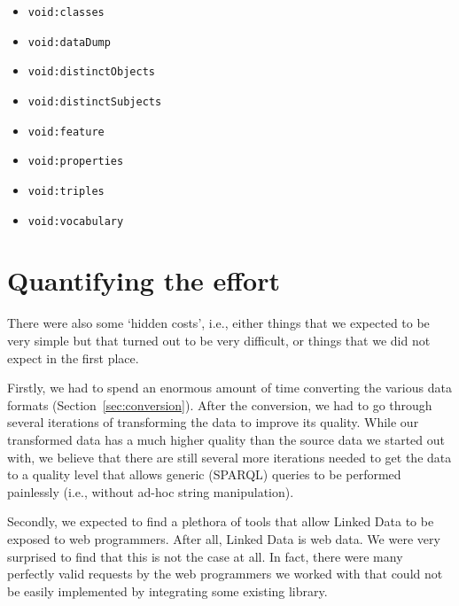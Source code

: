 \documentclass[a4paper]{scrartcl}
\newcommand{\textt}[1]{{\small \texttt{#1}}}
\begin{document}
\begin{itemize}
\item \textt{void:classes}
\item \textt{void:dataDump}
\item \textt{void:distinctObjects}
\item \textt{void:distinctSubjects}
\item \textt{void:feature}
\item \textt{void:properties}
\item \textt{void:triples}
\item \textt{void:vocabulary}
\end{itemize}


\section{Quantifying the effort}
\label{sec:quantifying}

There were also some `hidden costs', i.e., either things that we
expected to be very simple but that turned out to be very difficult,
or things that we did not expect in the first place.

Firstly, we had to spend an enormous amount of time converting the
various data formats (Section~\ref{sec:conversion}).  After the
conversion, we had to go through several iterations of transforming
the data to improve its quality.  While our transformed data has a
much higher quality than the source data we started out with, we
believe that there are still several more iterations needed to get the
data to a quality level that allows generic (SPARQL) queries to be
performed painlessly (i.e., without ad-hoc string manipulation).

Secondly, we expected to find a plethora of tools that allow Linked
Data to be exposed to web programmers.  After all, Linked Data is web
data.  We were very surprised to find that this is not the case at
all.  In fact, there were many perfectly valid requests by the web
programmers we worked with that could not be easily implemented by
integrating some existing library.

\end{document}
